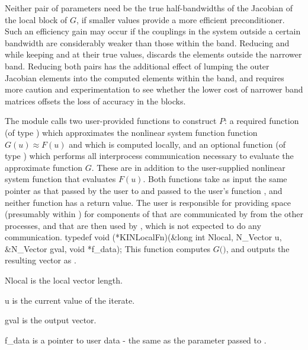 Neither pair of parameters need be the true half-bandwidths of the Jacobian
of the local block of $G$, if smaller values provide a more efficient
preconditioner.  Such an efficiency gain may occur if the couplings
in the system outside a certain bandwidth are considerably weaker than
those within the band.  Reducing  and  while keeping
 and  at their true values, discards the elements
outside the narrower band.  Reducing both pairs has the additional
effect of lumping the outer Jacobian elements into the computed elements
within the band, and requires more caution and experimentation to see
whether the lower cost of narrower band matrices offsets the loss of
accuracy in the blocks.

The {\kinbbdpre} module calls two user-provided functions to construct $P$: 
a required function  (of type ) which
approximates the nonlinear system function function $G(u) \approx F(u)$ and which 
is computed locally, and an optional function  (of type ) 
which performs all interprocess communication necessary to evaluate 
the approximate function $G$.  
These are in addition to the user-supplied nonlinear system function that 
evaluates $F(u)$.
Both functions take as input the same pointer  as that passed
by the user to  and passed to the user's function ,
and neither function has a return value. The user is responsible for
providing space (presumably within ) for components of 
that are communicated by  from the other processes, and that are
then used by , which is not expected to do any communication.
{
  typedef void (*KINLocalFn)(&long int Nlocal, N\_Vector u, \\
                             &N\_Vector gval, void *f\_data);
}
{
  This function computes $G($$)$, and outputs the resulting
  vector as .
}
{
  \begin{args}[Nlocal]
  \item[Nlocal] 
    is the local vector length.
  \item[u]
    is the current value of the iterate.
  \item[gval]
    is the output vector.
  \item[f\_data]
    is a pointer to user data - the same as the       
    parameter passed to .  
  \end{args}
}
